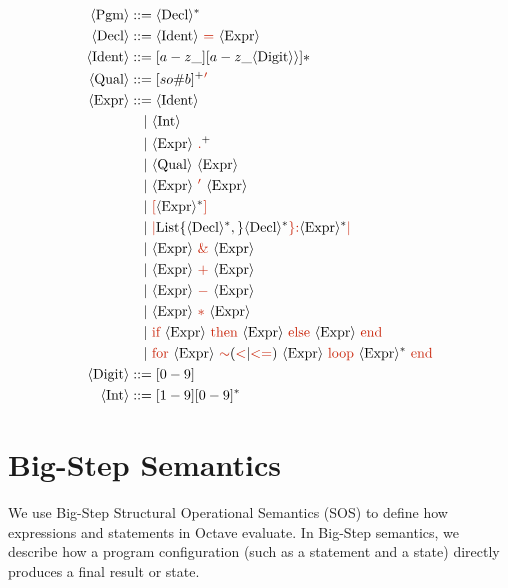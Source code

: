 \documentclass[letterpaper,12pt]{article}
\begin{document}
\newcommand{\nt}[1]{\textcolor{syntax_color}{#1}}
\newcommand{\ntext}[1]{\textcolor{syntax_color}{\text{#1}}}
\newcommand{\term}[1]{\langle \text{#1} \rangle}
\begin{align*}
    \term{Pgm} &::= \langle \text{Decl} \rangle^* \\
    \langle \text{Decl} \rangle &::= \term{Ident} \ \ntext{=} \ \langle \text{Expr} \rangle \\
    \term{Ident} &::= [a-z\_][a-z\_\term{Digit} \rangle]* \\
    \term{Qual} &::= [so\#b]^+\textcolor{syntax_color}{'} \\
    \term{Expr} &::= \langle \text{Ident} \rangle \\
    &\quad | \ \langle \text{Int} \rangle \\
    &\quad | \ \term{Expr} \ \textcolor{syntax_color}{.}^+ \\
    &\quad | \ \term{Qual} \ \term{Expr} \\
    &\quad | \ \term{Expr} \ \nt{'} \ \term{Expr} \\
    &\quad | \ \nt{[} \term{Expr}^* \nt{]} \\
    &\quad | \ \nt{|} \text{List\{} \term{Decl}^*, \text{\}} \term{Decl}^* \nt{\rbrace} \nt{:} \term{Expr}^* \nt{|} \\
    &\quad | \ \term{Expr} \ \nt{\&} \ \term{Expr} \\
    &\quad | \ \term{Expr} \ \nt{+} \ \term{Expr} \\
    &\quad | \ \term{Expr} \ \nt{-} \ \term{Expr} \\
    &\quad | \ \term{Expr} \ \nt{*} \ \term{Expr} \\
    &\quad | \ \ntext{\text{if}}\  \term{Expr} \ \ntext{then}\ \term{Expr} \ \ntext{else}\ \term{Expr} \ \ntext{end} \\
    &\quad | \ \textcolor{syntax_color}{\text{for}}\  \term{Expr} \ \textcolor{syntax_color}{\sim}{(\nt{<}|\nt{<=})}\ \term{Expr} \ \textcolor{syntax_color}{\text{loop}}\ \term{Expr}^* \ \ntext{end} \\
   \term{Digit} &::= {[0-9]} \\
    \term{Int} &::= {[1-9][0-9]^*}
\end{align*}


\section{Big-Step Semantics}

We use Big-Step Structural Operational Semantics (SOS) to define how expressions 
and statements in Octave evaluate. In Big-Step semantics, we describe how a program configuration (such as a statement and a state) directly produces a final result or state. 
\end{document}
